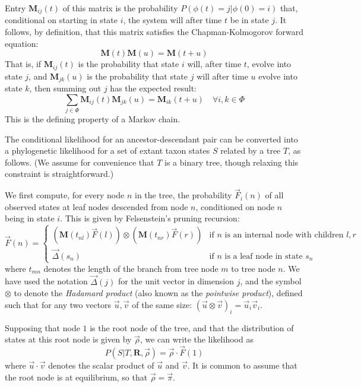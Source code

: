 \documentclass{bmcart}
\newcommand{\matr}[1]{\mathbf{#1}}
\newcommand{\statespace}{\Phi}
\newcommand{\state}{\phi}
\newcommand{\ratematrix}{\matr{R}}
\newcommand{\eqmvec}{\vec{\pi}}
\newcommand{\condmatrix}{\matr{M}}
\newcommand{\felsvec}{\vec{F}}
\newcommand{\unitvec}{\vec{\Delta}}
\newcommand{\pointprod}{\otimes}
\newcommand{\scalarprod}{\cdot}
\newcommand{\initvec}{\vec{\rho}}
\begin{document}
Entry $\condmatrix_{ij}(t)$ of this matrix is the probability
$P(\state(t)=j|\state(0)=i)$
that, conditional on starting in state $i$,
the system will after time $t$ be in state $j$.
It follows, by definition, that this matrix satisfies the
Chapman-Kolmogorov forward equation:
\begin{equation}
\condmatrix(t) \condmatrix(u) = \condmatrix(t+u)
\label{ChapmanKolmogorov}
\end{equation}
That is, if $\condmatrix_{ij}(t)$ is the probability
that state $i$ will, after time $t$, evolve into state $j$,
and $\condmatrix_{jk}(u)$ is the probability that state $j$ will after time $u$ evolve into state $k$,
then summing out $j$ has the expected result:
\[
\sum_{j \in \statespace} \condmatrix_{ij}(t) \condmatrix_{jk}(u) = \condmatrix_{ik}(t+u)
\quad \forall i,k \in \statespace
\]
This is the defining property of a Markov chain.

The conditional likelihood for an ancestor-descendant pair can be converted
into a phylogenetic likelihood for a set of extant taxon states $S$ related by a tree $T$,
as follows.
(We assume for convenience that $T$ is a binary tree, though relaxing this constraint is straightforward.)

We first compute, for every node $n$ in the tree,
the probability $\felsvec_i(n)$
of all observed states at leaf nodes descended from node $n$,
conditioned on node $n$ being in state $i$.
This is given by Felsenstein's pruning recursion:
\begin{equation}
\felsvec(n) = \left\{
\begin{array}{ll}
\displaystyle
\left( \condmatrix(t_{nl}) \felsvec(l) \right)
\pointprod
\left( \condmatrix(t_{nr}) \felsvec(r) \right)
& \mbox{if $n$ is an internal node with children $l,r$} \\
\displaystyle
\vec{\Delta}(s_n)
& \mbox{if $n$ is a leaf node in state $s_n$}
\end{array}
\right.
\label{Felsenstein}
\end{equation}
where $t_{mn}$ denotes the length of the branch from tree node $m$ to tree node $n$.
We have used the notation
$\unitvec(j)$ for the unit vector in dimension $j$,
and the symbol
$\pointprod$ to denote the {\em Hadamard product} (also known as the {\em pointwise product}),
defined such that for any two vectors $\vec{u},\vec{v}$ of the same size:
$(\vec{u} \pointprod \vec{v})_i = \vec{u}_i \vec{v}_i$.

Supposing that node $1$ is the root node of the tree,
and that the distribution of states at this root node is given by $\initvec$,
we can write the likelihood as
\begin{equation}
P(S|T,\ratematrix,\initvec) = \initvec \scalarprod \felsvec(1)
\label{Likelihood}
\end{equation}
where $\vec{u} \scalarprod \vec{v}$ denotes the scalar product of $\vec{u}$ and $\vec{v}$.
It is common to assume that the root node is at equilibrium,
so that $\initvec = \eqmvec$.
\end{document}
